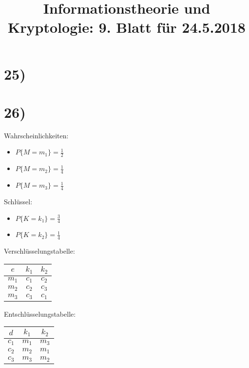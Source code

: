 %



  \title{Informationstheorie und Kryptologie: 9. Blatt für 24.5.2018}
  \maketitle

  \section*{25)}

  \section*{26)}

  \begin{multicols}{2}
    Wahrscheinlichkeiten:

    \begin{itemize}
      \item $P\{M = m_1\} = \frac{1}{2}$
      \item $P\{M = m_2\} = \frac{1}{4}$
      \item $P\{M = m_3\} = \frac{1}{4}$
    \end{itemize}

    \columnbreak

    Schlüssel:

    \begin{itemize}
      \item $P\{K = k_1\} = \frac{3}{4}$
      \item $P\{K = k_2\} = \frac{1}{4}$
    \end{itemize}
  \end{multicols}

  \begin{multicols}{2}
    Verschlüsselungstabelle:

    \begin{tabular}{|*3{c|}}
      \hline
      $e$ & $k_1$ & $k_2$ \\
      \hline
      $m_1$ & $c_1$ & $c_2$ \\
      $m_2$ & $c_2$ & $c_3$ \\
      $m_3$ & $c_3$ & $c_1$ \\
      \hline
    \end{tabular}

    \columnbreak

    Entschlüsselungstabelle:

    \begin{tabular}{|*3{c|}}
      \hline
      $d$ & $k_1$ & $k_2$ \\
      \hline
      $c_1$ & $m_1$ & $m_3$ \\
      $c_2$ & $m_2$ & $m_1$ \\
      $c_3$ & $m_3$ & $m_2$ \\
      \hline
    \end{tabular}
  \end{multicols}

